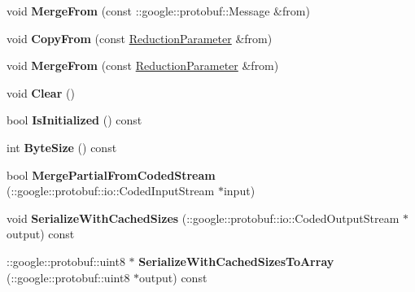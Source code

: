 \begin{DoxyCompactItemize}
\mbox{\label{classcaffe_1_1_reduction_parameter_ac64d4753d4e87e414229658d6ea0e1e4}} 
void {\bfseries Merge\+From} (const \+::google\+::protobuf\+::\+Message \&from)
\item 
\mbox{\label{classcaffe_1_1_reduction_parameter_a3f0955ffdde171028ebee3a9571f22fb}} 
void {\bfseries Copy\+From} (const \mbox{\hyperlink{classcaffe_1_1_reduction_parameter}{Reduction\+Parameter}} \&from)
\item 
\mbox{\label{classcaffe_1_1_reduction_parameter_a2f471514ab044c53693954e3a0f0d405}} 
void {\bfseries Merge\+From} (const \mbox{\hyperlink{classcaffe_1_1_reduction_parameter}{Reduction\+Parameter}} \&from)
\item 
\mbox{\label{classcaffe_1_1_reduction_parameter_ae810b98be3d49c1d267aec0ce8607e49}} 
void {\bfseries Clear} ()
\item 
\mbox{\label{classcaffe_1_1_reduction_parameter_a91752db5a0e4c7174906cb00c7859f64}} 
bool {\bfseries Is\+Initialized} () const
\item 
\mbox{\label{classcaffe_1_1_reduction_parameter_a29230cc5cbf0acde99f588cb24df14e6}} 
int {\bfseries Byte\+Size} () const
\item 
\mbox{\label{classcaffe_1_1_reduction_parameter_afd1b4a17a372566e7e3468108e2fae32}} 
bool {\bfseries Merge\+Partial\+From\+Coded\+Stream} (\+::google\+::protobuf\+::io\+::\+Coded\+Input\+Stream $\ast$input)
\item 
\mbox{\label{classcaffe_1_1_reduction_parameter_a51c6fc64071d7e644837fefbbe8f9d64}} 
void {\bfseries Serialize\+With\+Cached\+Sizes} (\+::google\+::protobuf\+::io\+::\+Coded\+Output\+Stream $\ast$output) const
\item 
\mbox{\label{classcaffe_1_1_reduction_parameter_a4af74b80bc35e6150ac8f0a7d147f11e}} 
\+::google\+::protobuf\+::uint8 $\ast$ {\bfseries Serialize\+With\+Cached\+Sizes\+To\+Array} (\+::google\+::protobuf\+::uint8 $\ast$output) const

\end{DoxyCompactItemize}
